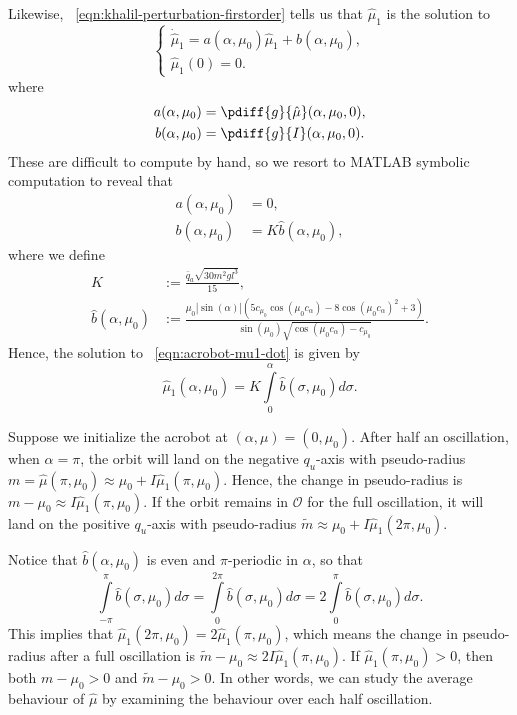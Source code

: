 Likewise, ~\eqref{eqn:khalil-perturbation-firstorder} tells us that 
\(\hat{\mu}_1\) is the solution to
\begin{equation}\label{eqn:acrobot-mu1-dot}
    \begin{cases}
        \dot{\hat{\mu}}_1 = a(\alpha,\mu_0)\hat{\mu}_1 + b(\alpha,\mu_0)
        , \\
        \hat{\mu}_1(0) = 0
        .
    \end{cases}
\end{equation}
where
\begin{align*}
    a(\alpha,\mu_0) &= \pdiff{g}{\hat{\mu}}(\alpha,\mu_0,0)
    , \\
    b(\alpha, \mu_0) &= \pdiff{g}{I}(\alpha, \mu_0, 0)
    .
\end{align*}
These are difficult to compute by hand, so we resort to MATLAB symbolic
computation to reveal that
\begin{align*}
    a(\alpha,\mu_0) &= 0
    , \\
    b(\alpha,\mu_0) &= K \hat{b}(\alpha,\mu_0)
    ,
\end{align*}
where we define
\begin{align*}
    K &:= \frac{\bar{q}_a \sqrt{30m^2g l^3}}{15}
    , \\
    \hat{b}(\alpha,\mu_0) &:= \frac{
        \mu_0 |\sin(\alpha)| \left(
        5 c_{\mu_0} \cos(\mu_0 c_\alpha) - 8 \cos(\mu_0c_\alpha)^2 + 3
    \right)
    }{
    \sin(\mu_0)\sqrt{\cos(\mu_0c_\alpha) - c_{\mu_0}}
    }
    .
\end{align*}
Hence, the solution to ~\eqref{eqn:acrobot-mu1-dot} is given by
\[
    \hat{\mu}_1(\alpha,\mu_0) =
    K \int \limits_0^\alpha \hat{b}(\sigma,\mu_0)d\sigma
    .
\]

Suppose we initialize the acrobot at \((\alpha,\mu) = (0,\mu_0)\). 
After half an oscillation, when \(\alpha = \pi\), the orbit will land on the
negative \(q_u\)-axis with pseudo-radius 
\(m = \hat{\mu}(\pi,\mu_0) \approx \mu_0 + I\hat{\mu}_1(\pi,\mu_0)\).
Hence, the change in pseudo-radius is 
\(m - \mu_0 \approx I\hat{\mu}_1(\pi,\mu_0)\).
If the orbit remains in \(\mathcal{O}\) for the full oscillation, 
it will land on the positive \(q_u\)-axis
with pseudo-radius
\(\tilde{m} \approx \mu_0 + I\hat{\mu}_1(2\pi,\mu_0)\).

Notice that \(\hat{b}(\alpha,\mu_0)\) is even and 
\(\pi\)-periodic in \(\alpha\), so that
\begin{equation}\label{eqn:bhat-integral-properties}
    \int \limits_{-\pi}^\pi \hat{b}(\sigma,\mu_0) d\sigma
    = \int \limits_0 ^ {2 \pi} \hat{b}(\sigma,\mu_0) d\sigma
    = 2 \int \limits_0^\pi \hat{b}(\sigma,\mu_0) d\sigma
    .
\end{equation}
This implies that 
\(\hat{\mu}_1(2\pi,\mu_0) = 2 \hat{\mu}_1(\pi,\mu_0)\),
which means the change in pseudo-radius after a full oscillation is 
\(\tilde{m} - \mu_0 \approx 2I\hat{\mu}_1(\pi,\mu_0)\).
If \(\hat{\mu}_1(\pi,\mu_0) > 0\), 
then both \(m - \mu_0 > 0\) and \(\tilde{m} - \mu_0 > 0\).
In other words, we can study the average behaviour of \(\hat{\mu}\) by examining
the behaviour over each half oscillation.

